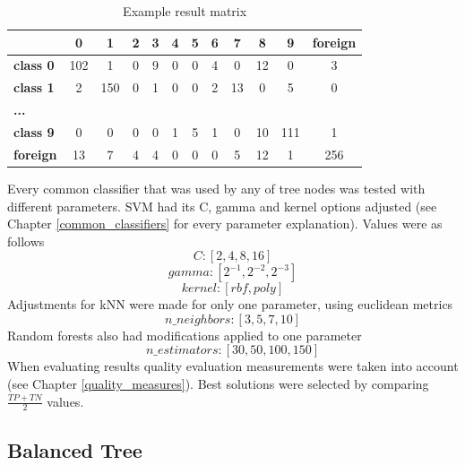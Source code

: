 \begin{table}[htp]
	\centering
	\caption{Example result matrix}
	\label{example_result_matrix}
	\begin{tabular}{l|c|c|c|c|c|c|c|c|c|c|c|}
		\cline{2-12}
		& \textbf{0} & \textbf{1} & \textbf{2} & \textbf{3} & \textbf{4} & \textbf{5} & \textbf{6} & \textbf{7} & \textbf{8} & \textbf{9} & \textbf{foreign} \\ \hline
		\multicolumn{1}{|l|}{\textbf{class 0}} & 102        & 1          & 0          & 9          & 0          & 0          & 4          & 0          & 12         & 0          & 3                \\ \hline
		\multicolumn{1}{|l|}{\textbf{class 1}} & 2          & 150        & 0          & 1          & 0          & 0          & 2          & 13         & 0          & 5          & 0                \\ \hline
		\multicolumn{1}{|l|}{\textbf{...}}     &            &            &            &            &            &            &            &            &            &            &                  \\ \hline
		\multicolumn{1}{|l|}{\textbf{class 9}} & 0          & 0          & 0          & 0          & 1          & 5          & 1          & 0          & 10         & 111        & 1                \\ \hline
		\multicolumn{1}{|l|}{\textbf{foreign}} & 13         & 7          & 4          & 4          & 0          & 0          & 0          & 5          & 12         & 1          & 256              \\ \hline
	\end{tabular}
\end{table}

Every common classifier that was used by any of tree nodes was tested with different parameters. SVM had its C, gamma and kernel options adjusted (see Chapter \ref{common_classifiers} for every parameter explanation). Values were as follows \[ C: [ 2, 4, 8, 16 ] \] \[ gamma: [ 2^{-1}, 2^{-2}, 2^{-3} ] \]  \[ kernel: [ rbf, poly ] \] 
Adjustments for kNN were made for only one parameter, using euclidean metrics \[ n\_neighbors: [ 3, 5, 7, 10 ] \]
Random forests also had modifications applied to one parameter \[ n\_estimators: [ 30, 50, 100, 150 ] \]
When evaluating results quality evaluation measurements were taken into account (see Chapter \ref{quality_measures}). Best solutions were selected by comparing $ \frac{TP + TN}{2} $ values.

\subsection{Balanced Tree}

